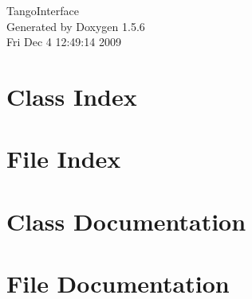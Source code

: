 \documentclass[a4paper]{book}
\begin{document}
\begin{titlepage}
\vspace*{7cm}
\begin{center}
{\Large TangoInterface }\\
\vspace*{1cm}
{\large Generated by Doxygen 1.5.6}\\
\vspace*{0.5cm}
{\small Fri Dec 4 12:49:14 2009}\\
\end{center}
\end{titlepage}
\clearemptydoublepage
{}
\tableofcontents
\clearemptydoublepage
{}
\chapter{Class Index}

\chapter{File Index}

\chapter{Class Documentation}


\chapter{File Documentation}








\printindex
\end{document}
